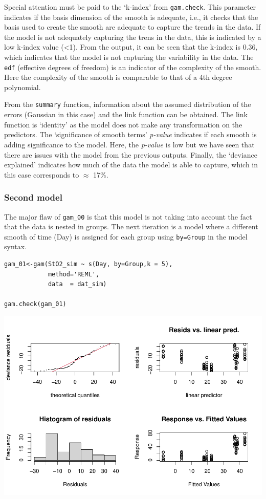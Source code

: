 \documentclass[Royal,times,sagev]{sagej}
\begin{document}
Special attention must be paid to the `k-index' from \texttt{gam.check}.
This parameter indicates if the basis dimension of the smooth is
adequate, i.e., it checks that the basis used to create the smooth are
adequate to capture the trends in the data. If the model is not
adequately capturing the trens in the data, this is indicated by a low
k-index value (\textless1). From the output, it can be seen that the
k-index is 0.36, which indicates that the model is not capturing the
variability in the data. The \texttt{edf} (effective degrees of freedom)
is an indicator of the complexity of the smooth. Here the complexity of
the smooth is comparable to that of a 4th degree polynomial.

From the \texttt{summary} function, information about the assumed
distribution of the errors (Gaussian in this case) and the link function
can be obtained. The link function is `identity' as the model does not
make any transformation on the predictors. The `significance of smooth
terms' \emph{p-value} indicates if each smooth is adding significance to
the model. Here, the \emph{p-value} is low but we have seen that there
are issues with the model from the previous outputs. Finally, the
`deviance explained' indicates how much of the data the model is able to
capture, which in this case corresponds to \(\approx\) 17\%.

\hypertarget{second-model}{%
\subsubsection{Second model}\label{second-model}}

The major flaw of \texttt{gam\_00} is that this model is not taking into
account the fact that the data is nested in groups. The next iteration
is a model where a different smooth of time (Day) is assigned for each
group using \texttt{by=Group} in the model syntax.

\begin{verbatim}
gam_01<-gam(StO2_sim ~ s(Day, by=Group,k = 5),
            method='REML',
            data  = dat_sim)

gam.check(gam_01)
\end{verbatim}

\includegraphics{Full_document_SAGE_files/figure-latex/second-GAM-1.pdf}
\end{document}
